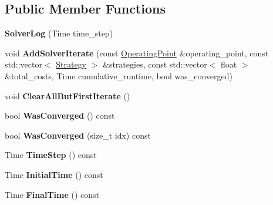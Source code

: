 \subsection*{Public Member Functions}
\begin{DoxyCompactItemize}
\item 
{\bfseries Solver\+Log} (Time time\+\_\+step)\hypertarget{classilqgames_1_1_solver_log_a7cc54ade816d9ab9d8e794f72a8aee64}{}\label{classilqgames_1_1_solver_log_a7cc54ade816d9ab9d8e794f72a8aee64}

\item 
void {\bfseries Add\+Solver\+Iterate} (const \hyperlink{structilqgames_1_1_operating_point}{Operating\+Point} \&operating\+\_\+point, const std\+::vector$<$ \hyperlink{structilqgames_1_1_strategy}{Strategy} $>$ \&strategies, const std\+::vector$<$ float $>$ \&total\+\_\+costs, Time cumulative\+\_\+runtime, bool was\+\_\+converged)\hypertarget{classilqgames_1_1_solver_log_abbd4f1c7a064c3ae772633762d60a11e}{}\label{classilqgames_1_1_solver_log_abbd4f1c7a064c3ae772633762d60a11e}

\item 
void {\bfseries Clear\+All\+But\+First\+Iterate} ()\hypertarget{classilqgames_1_1_solver_log_aeb7c725598ed426c4428bd51ceaa0931}{}\label{classilqgames_1_1_solver_log_aeb7c725598ed426c4428bd51ceaa0931}

\item 
bool {\bfseries Was\+Converged} () const \hypertarget{classilqgames_1_1_solver_log_a1555d4b57427b3449c28e87a4b999905}{}\label{classilqgames_1_1_solver_log_a1555d4b57427b3449c28e87a4b999905}

\item 
bool {\bfseries Was\+Converged} (size\+\_\+t idx) const \hypertarget{classilqgames_1_1_solver_log_ace7a4654de1ca7e4250ebe3a93adad28}{}\label{classilqgames_1_1_solver_log_ace7a4654de1ca7e4250ebe3a93adad28}

\item 
Time {\bfseries Time\+Step} () const \hypertarget{classilqgames_1_1_solver_log_a133c4f7326bc17d88dac054988a8ba2c}{}\label{classilqgames_1_1_solver_log_a133c4f7326bc17d88dac054988a8ba2c}

\item 
Time {\bfseries Initial\+Time} () const \hypertarget{classilqgames_1_1_solver_log_aaaf83583b07bc9b9974ff0a21b11129b}{}\label{classilqgames_1_1_solver_log_aaaf83583b07bc9b9974ff0a21b11129b}

\item 
Time {\bfseries Final\+Time} () const \hypertarget{classilqgames_1_1_solver_log_a7d4f0d183aaa7f5a0a0818a301f4994f}{}\label{classilqgames_1_1_solver_log_a7d4f0d183aaa7f5a0a0818a301f4994f}


\end{DoxyCompactItemize}
